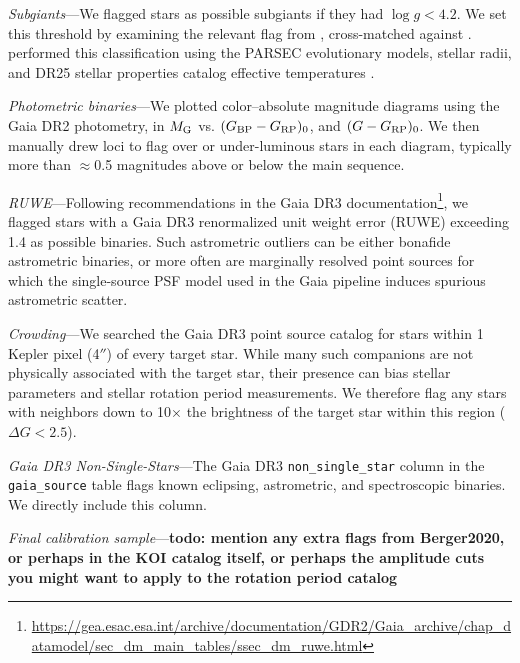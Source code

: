 \documentclass[11pt,twocolumn,tighten]{aastex63}
\begin{document}
{\it Subgiants}---We flagged stars as possible subgiants if they had
$\log g < 4.2$.  We set this threshold by examining the
relevant flag from \citet{berger_2018_radii_evolnstates},
cross-matched against \citet{Berger_2020a_catalog}.
\citet{berger_2018_radii_evolnstates} performed this classification
using the PARSEC evolutionary models, stellar radii, and DR25 stellar
properties catalog effective temperatures \citep{Mathur_2017}.

{\it Photometric binaries}---We plotted color--absolute magnitude
diagrams using the Gaia DR2 photometry, in $M_{\rm G}$ vs. $(G_{\rm
BP} - G_{\rm RP})_0$, and $(G - G_{\rm RP})_0$.  We then manually drew
loci to flag over or under-luminous stars in each diagram, typically
more than $\approx$0.5 magnitudes above or below the main sequence.

{\it RUWE}---Following recommendations in the Gaia DR3
documentation\footnote{\url{https://gea.esac.esa.int/archive/documentation/GDR2/Gaia_archive/chap_datamodel/sec_dm_main_tables/ssec_dm_ruwe.html}},
we flagged stars with a Gaia DR3 renormalized unit weight error (RUWE)
exceeding 1.4 as possible binaries.  Such astrometric outliers can be
either bonafide astrometric binaries, or more often are marginally
resolved point sources for which the single-source PSF model used in
the Gaia pipeline induces spurious astrometric scatter.

{\it Crowding}---We searched the Gaia DR3 point source catalog for
stars within 1 Kepler pixel (4$''$) of every target star.
While many such companions are not physically associated with the
target star, their presence can bias stellar parameters and stellar
rotation period measurements.
We therefore flag any stars with neighbors down to 10$\times$ the 
brightness of the target star within this region ($\Delta G < 2.5$).

{\it Gaia DR3 Non-Single-Stars}---The Gaia DR3
\texttt{non\_single\_star} column in the \texttt{gaia\_source} table
flags known eclipsing, astrometric, and spectroscopic binaries.  We
directly include this column.

{\it Final calibration sample}---{\bf todo: mention any extra flags
from Berger2020, or perhaps in the KOI catalog itself, or perhaps the
amplitude cuts you might want to apply to the rotation period catalog}
\end{document}
